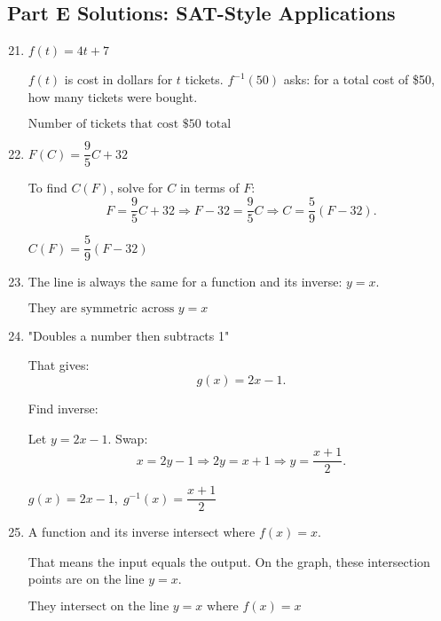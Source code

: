 \documentclass[12pt]{article}
\begin{document}
\subsection*{Part E Solutions: SAT-Style Applications}
\begin{enumerate}
  \setcounter{enumi}{20}
  \item \(f(t) = 4t + 7\)

  \(f(t)\) is cost in dollars for \(t\) tickets.  
  \(f^{-1}(50)\) asks: for a total cost of \$50, how many tickets were bought.

  \(\boxed{\text{Number of tickets that cost \$50 total}}\)

  \item \(F(C) = \dfrac{9}{5}C + 32\)

  To find \(C(F)\), solve for \(C\) in terms of \(F\):
  \[
  F = \frac{9}{5}C + 32 \Rightarrow F - 32 = \frac{9}{5}C
  \Rightarrow C = \frac{5}{9}(F - 32).
  \]

  \(\boxed{C(F) = \dfrac{5}{9}(F - 32)}\)

  \item The line is always the same for a function and its inverse: \(y = x.\)

  \(\boxed{\text{They are symmetric across } y = x}\)

  \item "Doubles a number then subtracts 1"

  That gives:
  \[
  g(x) = 2x - 1.
  \]

  Find inverse:

  Let \(y = 2x - 1.\) Swap:
  \[
  x = 2y - 1 \Rightarrow 2y = x + 1 \Rightarrow y = \frac{x + 1}{2}.
  \]

  \(\boxed{g(x) = 2x - 1,\; g^{-1}(x) = \dfrac{x + 1}{2}}\)

  \item A function and its inverse intersect where \(f(x) = x.\)

  That means the input equals the output.  
  On the graph, these intersection points are on the line \(y = x.\)

  \(\boxed{\text{They intersect on the line } y = x \text{ where } f(x)=x}\)
\end{enumerate}
\end{document}
